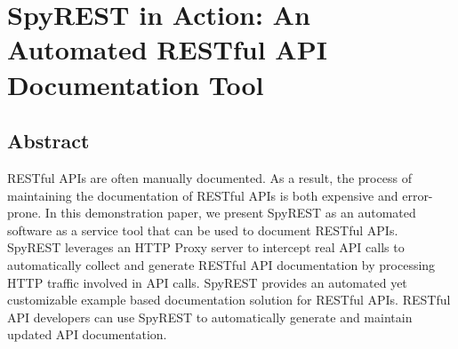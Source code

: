 


\chapter{SpyREST in Action: An Automated RESTful API Documentation Tool}



\section{Abstract}
RESTful APIs are often manually documented. As a result, the process of maintaining the documentation of RESTful APIs is both expensive and error-prone. In this demonstration paper, we present SpyREST as an automated software as a service tool that can be used to document RESTful APIs. SpyREST leverages an HTTP Proxy server to intercept real API calls to automatically collect and generate RESTful API documentation by processing HTTP traffic involved in API calls. SpyREST provides an automated yet customizable example based documentation solution for RESTful APIs. RESTful API developers can use SpyREST to automatically generate and maintain updated API documentation.




